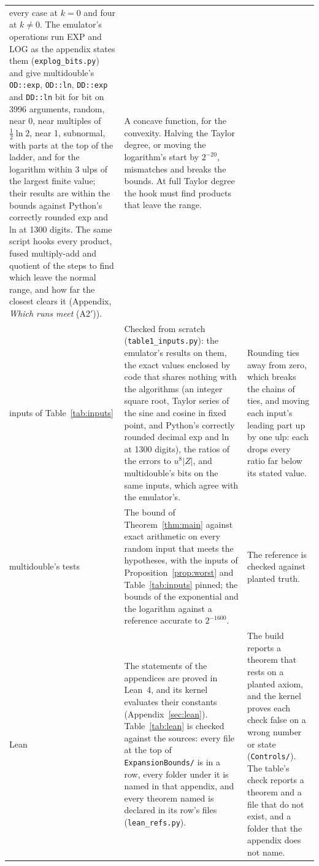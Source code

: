 \begin{table}[tp]
\begin{tabular}{@{}>{\raggedright\arraybackslash}p{}>{\raggedright\arraybackslash}p{}>{\raggedright\arraybackslash}p{}@{}}
every case at $k = 0$ and four at $k \ne 0$. The emulator's operations run EXP and LOG as the appendix states them
(\texttt{explog\_bits.py}) and give multidouble's \texttt{OD::exp}, \texttt{OD::ln}, \texttt{DD::exp} and
\texttt{DD::ln} bit for bit on 3996 arguments, random, near 0, near multiples of $\frac12\ln 2$, near 1, subnormal,
with parts at the top of the ladder, and for the logarithm within 3 ulps of the largest finite value; their results are
within the bounds against Python's correctly rounded exp and ln at 1300 digits. The same script hooks every product,
fused multiply-add and quotient of the steps to find which leave the normal range, and how far the closest clears it
(Appendix, \emph{Which runs meet} (A2$'$)). & A concave function, for the convexity. Halving the Taylor degree, or
moving the logarithm's start by $2^{-20}$, mismatches and breaks the bounds. At full Taylor degree the hook must find
products that leave the range. \\ \addlinespace
inputs of Table~\ref{tab:inputs} & Checked from scratch (\texttt{table1\_inputs.py}): the emulator's results on
them, the exact values enclosed by code that shares nothing with the algorithms (an integer square root, Taylor series
of the sine and cosine in fixed point, and Python's correctly rounded decimal exp and ln at 1300 digits), the ratios of
the errors to $u^8|Z|$, and multidouble's bits on the same inputs, which agree with the emulator's. & Rounding ties
away from zero, which breaks the chains of ties, and moving each input's leading part up by one ulp: each drops
every ratio far below its stated value. \\ \addlinespace
multidouble's tests & The bound of Theorem~\ref{thm:main} against exact arithmetic on every random input that meets
the hypotheses, with the inputs of Proposition~\ref{prop:worst} and Table~\ref{tab:inputs} pinned; the bounds of the
exponential and the logarithm against a reference accurate to $2^{-1600}$. & The reference is checked against planted
truth. \\ \addlinespace
Lean & The statements of the appendices are proved in Lean~4, and its kernel evaluates their constants
(Appendix~\ref{sec:lean}). Table~\ref{tab:lean} is checked against the sources: every file at the top of
\texttt{ExpansionBounds/} is in a row, every folder under it is named in that appendix, and every theorem named is
declared in its row's files (\texttt{lean\_refs.py}). & The build reports a theorem that rests on a planted axiom,
and the kernel proves each check false on a wrong number or state (\texttt{Controls/}). The table's check reports a
theorem and a file that do not exist, and a folder that the appendix does not name. \\
\bottomrule
\end{tabular}
\end{table}
